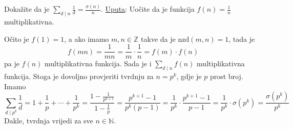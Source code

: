 \documentclass{exam}
\newcommand{\Mod}[1]{\ (\mathrm{mod}\ #1)}
\begin{document}
\begin{questions}
\question
{}

\begin{solution}
\end{solution}

\pagebreak

\question Dokažite da je $\displaystyle \sum_{d \mid n} \frac{1}{d} = \frac{\sigma(n)}{n}$. \newline
\underline{Uputa}: Uočite da je funkcija $f(n) = \frac{1}{n}$ multiplikativna.

\begin{solution}
  Očito je $f(1) = 1$, a ako imamo $m, n \in \mathbb{Z}$ takve da je $\text{nzd}(m, n) = 1$, tada je
  \[
    f(mn) = \frac{1}{mn} = \frac{1}{m} \cdot \frac{1}{n} = f(m) \cdot f(n)
  \]
  pa je $f(n)$ multiplikativna funkcija. Sada je i $\sum_{d \mid n} f(n)$ multiplikativna funkcija. Stoga je dovoljno provjeriti tvrdnju za $n = p^k$, gdje je $p$ prost broj. Imamo
  \[
    \sum_{d \mid p^k} \frac{1}{d} = 1 + \frac{1}{p} + \cdots + \frac{1}{p^k} = \frac{1 - \frac{1}{p^{k+1}}}{1 - \frac{1}{p}} = \frac{p^{k+1} - 1}{p^k(p - 1)} = \frac{1}{p^k} \cdot \frac{p^{k+1} - 1}{p - 1} = \frac{1}{p^k} \cdot \sigma(p^k) = \frac{\sigma(p^k)}{p^k}
  \]
  Dakle, tvrdnja vrijedi za sve $n \in \mathbb{N}$.
\end{solution}

\end{questions}
\end{document}
